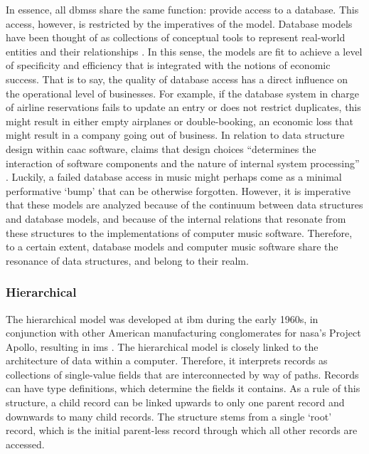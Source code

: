 In essence, all \gls{dbms}s share the same function: provide access to a database. This access, however, is restricted by the imperatives of the model. Database models have been thought of as collections of conceptual tools to represent real-world entities and their relationships \parencite[1]{2008:graph/anglesgutierrez/survey}. In this sense, the models are fit to achieve a level of specificity and efficiency that is integrated with the notions of economic success. That is to say, the quality of database access has a direct influence on the operational level of businesses. For example, if the database system in charge of airline reservations fails to update an entry or does not restrict duplicates, this might result in either empty airplanes or double-booking, an economic loss that might result in a company going out of business. In relation to data structure design within \gls{caac} software, \textcite{Ari05:Ano} claims that design choices ``determines the interaction of software components and the nature of internal system processing'' \parencite[18]{Ari05:Ano}. Luckily, a failed database access in music might perhaps come as a minimal performative `bump' that can be otherwise forgotten. However, it is imperative that these models are analyzed because of the continuum between data structures and database models, and because of the internal relations that resonate from these structures to the implementations of computer music software. Therefore, to a certain extent, database models and computer music software share the resonance of data structures, and belong to their realm.

% 
% 




\subsubsection{Hierarchical}
\label{model:hierarchical}


The hierarchical model was developed at \gls{ibm} during the early 1960s, in conjunction with other American manufacturing conglomerates for \gls{nasa}'s Project Apollo, resulting in \gls{ims} \parencite{2000-database-ims}. The hierarchical model is closely linked to the architecture of data within a computer. Therefore, it interprets records as collections of single-value fields that are interconnected by way of paths. Records can have type definitions, which determine the fields it contains. As a rule of this structure, a child record can be linked upwards to only one parent record and downwards to many child records. The structure stems from a single `root' record, which is the initial parent-less record through which all other records are accessed.

